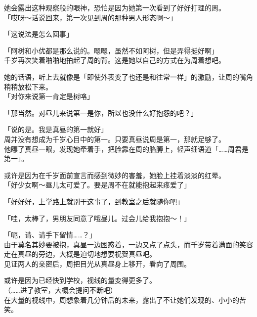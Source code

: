 她会露出这种观察般的眼神，恐怕是因为她第一次看到了好好打理的周。\\

「哎呀～话说回来，第一次见到周的那种男人形态啊～」

「这说法是怎么回事」

「阿树和小优都是那么说的。嗯嗯，虽然不如阿树，但是弄得挺好啊」\\

千岁再次笑着啪啪地拍起了周的背。这是她以自己的方式在为周着想吧。

她的话语，听上去就像是「即使外表变了也还是和往常一样」的激励，让周的嘴角稍稍放松下来。\\

「对你来说第一肯定是树咯」

「那当然。对昼儿来说第一是你，所以也没什么好抱怨的吧？」

「说的是。我是真昼的第一就好」\\

周并没有想成为千岁心目中的第一。只要真昼说周是第一，那就足够了。\\

他瞟了真昼一眼，发现她牵着手，把脸靠在周的胳膊上，轻声细语道「……周君是第一」。

或许是因为在千岁面前宣言而感到微妙的害羞，她脸上挂着淡淡的红晕。\\

「好少女啊～昼儿太可爱了。要是周不在就能抱起来疼爱了」

「好好好，上学路上就别干这事了，到教室之后就随你吧」

「哇，太棒了，男朋友同意了哦昼儿。过会儿给我抱抱～！」

「呃，请、请手下留情……？」\\

由于莫名其妙要被抱，真昼一边困惑着，一边又点了点头，而千岁带着满面的笑容走在真昼的旁边，大概是迫切地想要祝贺真昼吧。\\

见证两人的亲密后，周把目光从真昼身上移开，看向了周围。

或许是因为已经快到学校，视线的量变得更多了。\\

（……进了教室，大概会提问不断吧）\\

在大量的视线中，周想象着几分钟后的未来，露出了不让她们发现的、小小的苦笑。
